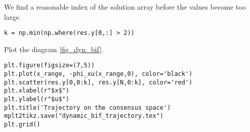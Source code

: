 We find a reasonable index of the solution array before the values
become too large.

\begin{verbatim}
k = np.min(np.where(res.y[0,:] > 2))
\end{verbatim}

Plot the diagram \cref{fig_dyn_bif}.

\begin{verbatim}
plt.figure(figsize=(7,5))
plt.plot(x_range, -phi_xu(x_range,0), color='black')
plt.scatter(res.y[0,0:k], res.y[N,0:k], color='red')
plt.xlabel(r"$x$")
plt.ylabel(r"$u$")
plt.title('Trajectory on the consensus space')
mplt2tikz.save("dynamic_bif_trajectory.tex")
plt.grid()
\end{verbatim}

